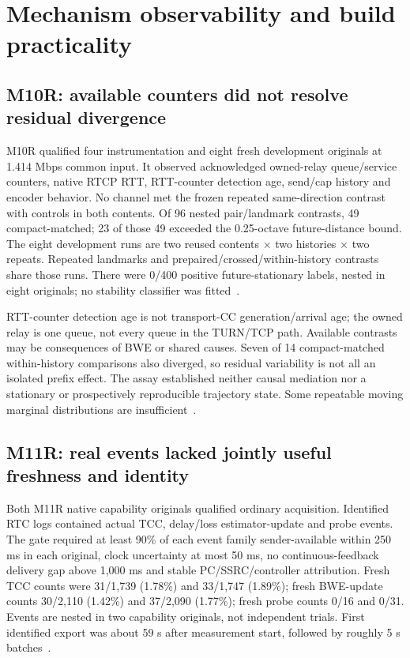 \documentclass[10pt]{article}
\begin{document}
\section{Mechanism observability and build practicality}
\subsection{M10R: available counters did not resolve residual divergence}
M10R qualified four instrumentation and eight fresh development originals at
1.414 Mbps common input. It observed acknowledged owned-relay queue/service
counters, native RTCP RTT, RTT-counter detection age, send/cap history and
encoder behavior. No channel met the frozen repeated same-direction contrast
with controls in both contents. Of 96 nested pair/landmark contrasts, 49
compact-matched; 23 of those 49 exceeded the 0.25-octave future-distance bound.
The eight development runs are two reused contents $\times$ two histories
$\times$ two repeats. Repeated landmarks and prepaired/crossed/within-history
contrasts share those runs. There were 0/400 positive future-stationary labels,
nested in eight originals; no stability classifier was fitted~\cite{m10r}.

RTT-counter detection age is not transport-CC generation/arrival age; the owned
relay is one queue, not every queue in the TURN/TCP path. Available contrasts
may be consequences of BWE or shared causes. Seven of 14 compact-matched
within-history comparisons also diverged, so residual variability is not all
an isolated prefix effect. The assay established neither causal mediation nor
a stationary or prospectively reproducible trajectory state. Some repeatable
moving marginal distributions are insufficient~\cite{m10r}.

\subsection{M11R: real events lacked jointly useful freshness and identity}
Both M11R native capability originals qualified ordinary acquisition. Identified
RTC logs contained actual TCC, delay/loss estimator-update and probe events.
The gate required at least 90\% of each event family sender-available within
250 ms in each original, clock uncertainty at most 50 ms, no continuous-feedback
delivery gap above 1,000 ms and stable PC/SSRC/controller attribution. Fresh TCC
counts were 31/1,739 (1.78\%) and 33/1,747 (1.89\%); fresh BWE-update counts
30/2,110 (1.42\%) and 37/2,090 (1.77\%); fresh probe counts 0/16 and 0/31.
Events are nested in two capability originals, not independent trials.
First identified export was about 59 s after measurement start, followed by
roughly 5 s batches~\cite{m11r}.
\end{document}
